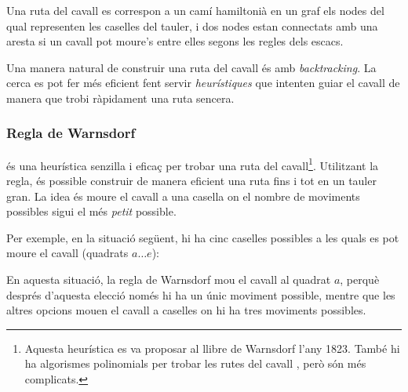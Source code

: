 Una ruta del cavall es correspon a un camí hamiltonià en un graf els
nodes del qual representen les caselles del tauler, i dos nodes estan
connectats amb una aresta si un cavall pot moure's entre elles segons
les regles dels escacs.

Una manera natural de construir una ruta del cavall és amb
\emph{backtracking}. La cerca es pot fer més eficient fent servir
\emph{heurístiques} que intenten guiar el cavall de manera que
trobi ràpidament una ruta sencera.

\subsubsection{Regla de Warnsdorf}

 

 és una heurística senzilla i eficaç per
trobar una ruta del cavall\footnote{Aquesta heurística es va proposar
al llibre de Warnsdorf \cite{war23} l'any 1823. També hi ha algorismes
polinomials per trobar les rutes del cavall \cite{par97}, però són més
complicats.}. Utilitzant la regla, és possible construir de manera
eficient una ruta fins i tot en un tauler gran. La idea és moure el
cavall a una casella on el nombre de moviments possibles sigui el més
\emph{petit} possible.

Per exemple, en la situació següent, hi ha cinc caselles possibles a
les quals es pot moure el cavall (quadrats $a \ldots e$):
\begin{center}
\end{center}
En aquesta situació, la regla de Warnsdorf mou el cavall al quadrat
$a$, perquè després d'aquesta elecció només hi ha un únic moviment
possible, mentre que les altres opcions mouen el cavall a caselles on
hi ha tres moviments possibles.
